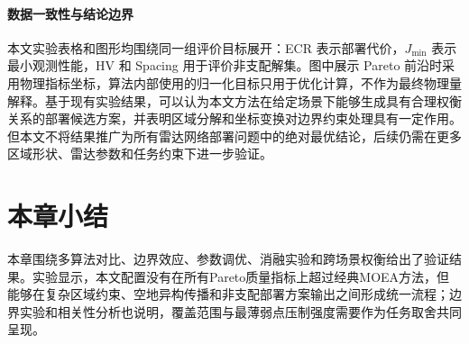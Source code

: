 \paragraph{数据一致性与结论边界}
本文实验表格和图形均围绕同一组评价目标展开：ECR 表示部署代价，$J_{\min}$ 表示最小观测性能，HV 和 Spacing 用于评价非支配解集。图中展示 Pareto 前沿时采用物理指标坐标，算法内部使用的归一化目标只用于优化计算，不作为最终物理量解释。基于现有实验结果，可以认为本文方法在给定场景下能够生成具有合理权衡关系的部署候选方案，并表明区域分解和坐标变换对边界约束处理具有一定作用。但本文不将结果推广为所有雷达网络部署问题中的绝对最优结论，后续仍需在更多区域形状、雷达参数和任务约束下进一步验证。

\section{本章小结}

本章围绕多算法对比、边界效应、参数调优、消融实验和跨场景权衡给出了验证结果。实验显示，本文配置没有在所有Pareto质量指标上超过经典MOEA方法，但能够在复杂区域约束、空地异构传播和非支配部署方案输出之间形成统一流程；边界实验和相关性分析也说明，覆盖范围与最薄弱点压制强度需要作为任务取舍共同呈现。
